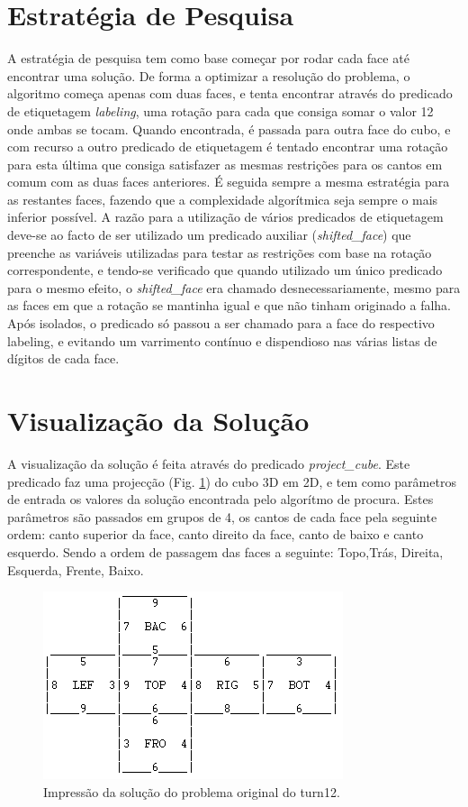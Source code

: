 \section{Estratégia de Pesquisa}
\label{rest:4}

A estratégia de pesquisa tem como base começar por rodar cada face até encontrar uma solução.
De forma a optimizar a resolução do problema, o algoritmo começa apenas com duas faces, e tenta encontrar através do predicado de etiquetagem \textit{labeling}, uma rotação para cada que consiga somar o valor 12 onde ambas se tocam.
Quando encontrada, é passada para outra face do cubo, e com recurso a outro predicado de etiquetagem é tentado encontrar uma rotação para esta última que consiga satisfazer as mesmas restrições para os cantos em comum com as duas faces anteriores. É seguida sempre a mesma estratégia para as restantes faces, fazendo que a complexidade algorítmica seja sempre o mais inferior possível.
A razão para a utilização de vários predicados de etiquetagem deve-se ao facto de ser utilizado um predicado auxiliar (\textit{shifted\_face}) que preenche as variáveis utilizadas para testar as restrições com base na rotação correspondente, e tendo-se verificado que quando utilizado um único predicado para o mesmo efeito, o \textit{shifted\_face} era chamado desnecessariamente, mesmo para as faces em que a rotação se mantinha igual e que não tinham originado a falha.
Após isolados, o predicado só passou a ser chamado para a face do respectivo labeling, e evitando um varrimento contínuo e dispendioso nas várias listas de dígitos de cada face.

\section{Visualização da Solução}
\label{rest:5}

A visualização da solução é feita através do predicado \textit{project\_cube}.
Este predicado faz uma projecção (Fig. \ref{fig:2}) do cubo 3D em 2D, e tem como parâmetros de entrada os valores da solução encontrada pelo algorítmo de procura. Estes parâmetros são passados em grupos de 4, os cantos de cada face pela seguinte ordem: canto superior da face, canto direito da face, canto de baixo e canto esquerdo. Sendo a ordem de passagem das faces a seguinte: Topo,Trás, Direita, Esquerda, Frente, Baixo.

\begin{figure}[H]
\begin{center}
\includegraphics[scale=0.6]{resol.png}
\caption{Impressão da solução do problema original do turn12.}
\label{fig:2}
\end{center}
\end{figure}

